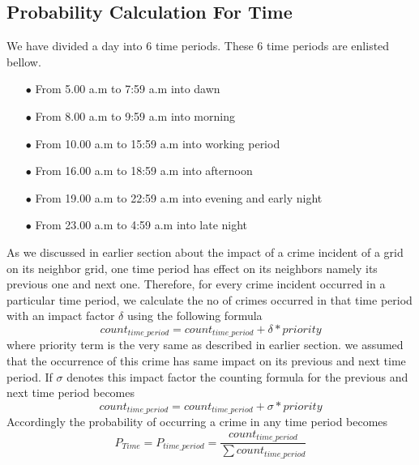 \documentclass{sig-alternate}
\begin{document}
\subsection{Probability Calculation For Time}
     We have divided a day into 6 time periods. These 6 time periods are enlisted bellow.
     \begin{enumerate}
     	\item[$\bullet$] {\sf From 5.00 a.m to 7:59 a.m into dawn}
     	\item[$\bullet$] {\sf From 8.00 a.m to 9:59 a.m into morning}
     	\item[$\bullet$] {\sf From 10.00 a.m to 15:59 a.m into working period}
     	\item[$\bullet$] {\sf From 16.00 a.m to 18:59 a.m into afternoon}
     	\item[$\bullet$] {\sf From 19.00 a.m to 22:59 a.m into evening and early night}
     	\item[$\bullet$] {\sf From 23.00 a.m to 4:59 a.m into late night}
     \end{enumerate}
     As we discussed in earlier section about the impact of a crime incident of a grid on its neighbor grid, one time period has effect on its neighbors namely its previous one and next one. Therefore, for every crime incident occurred in a particular time period, we calculate the no of crimes occurred in that time period with an impact factor $\delta$ using the following formula
      \begin{equation}
          count_{time\_period} = count_{time\_period} + \delta * priority
          \label{timeeffectone}
      \end{equation} 
      where priority term is the very same as described in earlier section. we assumed that the occurrence of this crime has same impact on its previous and next time period. If $\sigma$ denotes this impact factor the counting formula for the previous and next time period becomes 
      \begin{equation}
                count_{time\_period} = count_{time\_period} + \sigma * priority
                \label{timeeffecttwo}
       \end{equation} 
       Accordingly the probability of occurring a crime in any time period becomes
       \begin{equation}
           P_{Time} = P_{time\_period} = \frac{ count_{time\_period}}{\sum count_{time\_period}}
           \label{probtime}
       \end{equation}
       
\end{document}
